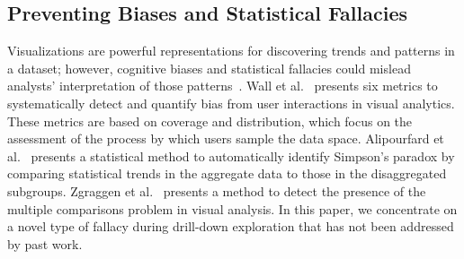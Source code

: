 \subsection{Preventing Biases and Statistical Fallacies}
Visualizations are powerful representations for discovering trends and patterns in a dataset; however, cognitive biases and statistical fallacies could mislead analysts' interpretation of those patterns~\cite{Alipourfard2018WSDM,Wall2017,Zgraggen2018CHI,Armstrong2014}. Wall et al.~\cite{Wall2017} presents six metrics to systematically detect and quantify bias from user interactions in visual analytics. These metrics are based on coverage and distribution, which focus on the assessment of the process by which users sample the data space. Alipourfard et al.~\cite{Alipourfard2018WSDM} presents a statistical method to automatically identify Simpson's paradox by comparing statistical trends in the aggregate data to those in the disaggregated subgroups. Zgraggen et al.~\cite{Zgraggen2018CHI} presents a method to detect the presence of the multiple comparisons problem in visual analysis. In this paper, we concentrate on a novel type of fallacy during drill-down exploration that has not been addressed by past work. %
